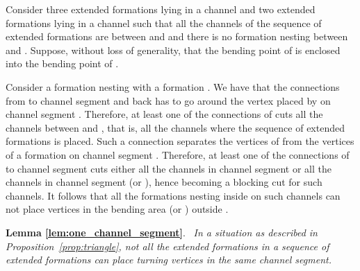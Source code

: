 \documentclass[a4paper,10pt]{llncs}
\newcounter{prop}
\renewenvironment{proof}
{{\bf Proof:}}{\hspace*{\fill}\par\vspace{2mm}}
\newcommand{\rephrase}[3]{\noindent\textbf{#1 #2}.~\emph{#3}}
\begin{document}
\begin{proof}
Consider three extended formations  lying in a channel  and two extended formations  lying in a channel  such that all the channels of the sequence of extended formations are between  and  and there is no formation  nesting between  and . Suppose, without loss of generality, that the bending point of  is enclosed into the bending point of .

Consider a formation  nesting with a formation . We have that the connections from  to channel segment  and back has to go around the vertex placed by  on channel segment . Therefore, at least one of the connections of  cuts all the channels between  and , that is, all the channels where the sequence of extended formations is placed. Such a connection separates the vertices of  from the vertices of a formation  on channel segment . Therefore, at least one of the connections of  to channel segment  cuts either all the channels in channel segment  or all the channels in channel segment  (or ), hence becoming a blocking cut for such channels. It follows that all the formations nesting inside   on such channels can not place vertices in the bending area  (or ) outside .
\end{proof}

\rephrase{Lemma}{\ref{lem:one_channel_segment}}{
In a situation as described in Proposition~\ref{prop:triangle}, not all the extended formations in a sequence of extended formations can place turning vertices in the same channel segment.
}
\end{document}
